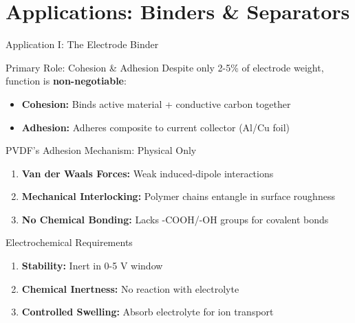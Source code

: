 \documentclass[aspectratio=169]{beamer}
\begin{document}
\section{Applications: Binders \& Separators}

\begin{frame}{Application I: The Electrode Binder}
    \begin{block}{Primary Role: Cohesion \& Adhesion}
        Despite only 2-5\% of electrode weight, function is \textbf{non-negotiable}:
        \begin{itemize}
            \item \textbf{Cohesion:} Binds active material + conductive carbon together
            \item \textbf{Adhesion:} Adheres composite to current collector (Al/Cu foil)
        \end{itemize}
    \end{block}
    
    \begin{alertblock}{PVDF's Adhesion Mechanism: Physical Only}
        \begin{enumerate}\small
            \item \textbf{Van der Waals Forces:} Weak induced-dipole interactions
            \item \textbf{Mechanical Interlocking:} Polymer chains entangle in surface roughness
            \item \textbf{No Chemical Bonding:} Lacks -COOH/-OH groups for covalent bonds
        \end{enumerate}
    \end{alertblock}
    
    \begin{block}{Electrochemical Requirements}
        \begin{enumerate}
            \item \textbf{Stability:} Inert in 0-5 V window
            \item \textbf{Chemical Inertness:} No reaction with electrolyte
            \item \textbf{Controlled Swelling:} Absorb electrolyte for ion transport
        \end{enumerate}
    \end{block}
\end{frame}
\end{document}
